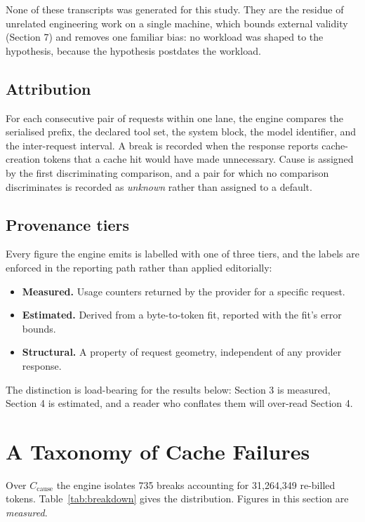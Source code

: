 \documentclass[11pt,twocolumn,letterpaper]{article}
\begin{document}
None of these transcripts was generated for this study. They are the residue of
unrelated engineering work on a single machine, which bounds external validity
(Section 7) and removes one familiar bias: no workload was shaped to the
hypothesis, because the hypothesis postdates the workload.

\subsection{Attribution}

For each consecutive pair of requests within one lane, the engine compares the
serialised prefix, the declared tool set, the system block, the model
identifier, and the inter-request interval. A break is recorded when the
response reports cache-creation tokens that a cache hit would have made
unnecessary. Cause is assigned by the first discriminating comparison, and a
pair for which no comparison discriminates is recorded as \emph{unknown} rather
than assigned to a default.

\subsection{Provenance tiers}

Every figure the engine emits is labelled with one of three tiers, and the
labels are enforced in the reporting path rather than applied editorially:

\begin{itemize}
  \item \textbf{Measured.} Usage counters returned by the provider for a
    specific request.
  \item \textbf{Estimated.} Derived from a byte-to-token fit, reported with the
    fit's error bounds.
  \item \textbf{Structural.} A property of request geometry, independent of any
    provider response.
\end{itemize}

The distinction is load-bearing for the results below: Section 3 is measured,
Section 4 is estimated, and a reader who conflates them will over-read
Section 4.

\section{A Taxonomy of Cache Failures}

Over $C_{\text{cause}}$ the engine isolates 735 breaks accounting for
31{,}264{,}349 re-billed tokens. Table~\ref{tab:breakdown} gives the
distribution. Figures in this section are \emph{measured}.
\end{document}
